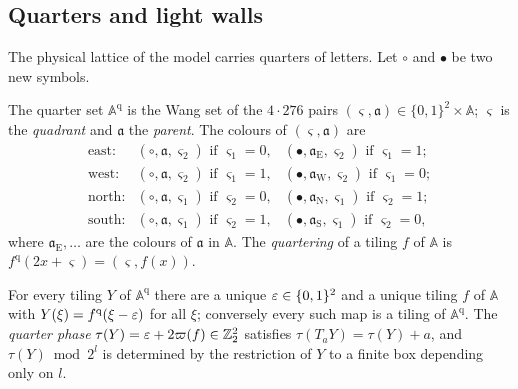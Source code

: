 \subsection{Quarters and light walls}\label{scf:sub-quarters}

The physical lattice of the model carries quarters of letters. Let $\circ$ and $\bullet$ be two new symbols.

\begin{definition}[Quarters]\label{scf:def-quarter}
The quarter set $\mathbb A^{\mathrm q}$ is the Wang set of the $4\cdot276$ pairs $(\varsigma,\mathfrak a)\in\{0,1\}^2\times\mathbb A$; $\varsigma$ is the \emph{quadrant} and $\mathfrak a$ the \emph{parent}. The colours of $(\varsigma,\mathfrak a)$ are
\[
\begin{array}{lll}
\text{east:} & (\circ,\mathfrak a,\varsigma_2)\text{ if }\varsigma_1=0, & (\bullet,\mathfrak a_{\mathrm E},\varsigma_2)\text{ if }\varsigma_1=1;\\
\text{west:} & (\circ,\mathfrak a,\varsigma_2)\text{ if }\varsigma_1=1, & (\bullet,\mathfrak a_{\mathrm W},\varsigma_2)\text{ if }\varsigma_1=0;\\
\text{north:} & (\circ,\mathfrak a,\varsigma_1)\text{ if }\varsigma_2=0, & (\bullet,\mathfrak a_{\mathrm N},\varsigma_1)\text{ if }\varsigma_2=1;\\
\text{south:} & (\circ,\mathfrak a,\varsigma_1)\text{ if }\varsigma_2=1, & (\bullet,\mathfrak a_{\mathrm S},\varsigma_1)\text{ if }\varsigma_2=0,
\end{array}
\]
where $\mathfrak a_{\mathrm E},\dots$ are the colours of $\mathfrak a$ in $\mathbb A$. The \emph{quartering} of a tiling $f$ of $\mathbb A$ is $f^{\mathrm q}(2x+\varsigma)=(\varsigma,f(x))$.
\end{definition}

\begin{lemma}\label{scf:quarter}
For every tiling $Y$ of $\mathbb A^{\mathrm q}$ there are a unique $\varepsilon\in\{0,1\}^2$ and a unique tiling $f$ of $\mathbb A$ with $Y(\xi)=f^{\mathrm q}(\xi-\varepsilon)$ for all $\xi$; conversely every such map is a tiling of $\mathbb A^{\mathrm q}$. The \emph{quarter phase} $\tau(Y)=\varepsilon+2\varpi(f)\in\mathbb{Z}_2^2$ satisfies $\tau(T_aY)=\tau(Y)+a$, and $\tau(Y)\bmod 2^l$ is determined by the restriction of $Y$ to a finite box depending only on $l$.
\end{lemma}


